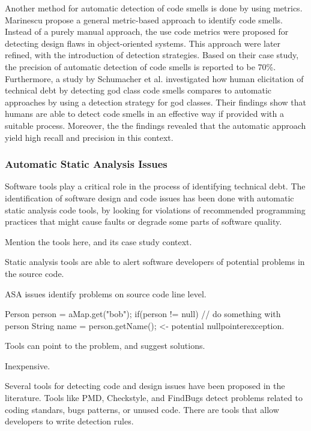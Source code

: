 Another method for automatic detection of code smells is done by using metrics. Marinescu\cite{marinescu2001detecting} propose a general metric-based approach to identify code smells. Instead of a purely manual approach, the use code metrics were proposed for detecting design flaws in object-oriented systems. This approach were later refined, with the introduction of detection strategies\cite{marinescu2004detection}. Based on their case study, the precision of automatic detection of code smells is reported to be 70\%. Furthermore, a study by Schumacher et al.\cite{schumacher2010building} investigated how human elicitation of technical debt by detecting god class code smells compares to automatic approaches by using a detection strategy for god classes. Their findings show that humans are able to detect code smells in an effective way if provided with a suitable process. Moreover, the the findings revealed that the automatic approach yield high recall and precision in this context. 



\subsubsection{Automatic Static Analysis Issues}
Software tools play a critical role in the process of identifying technical debt. The identification of software design and code issues has been done with automatic static analysis code tools, by looking for violations of recommended programming practices that might cause faults or degrade some parts of software quality. 

Mention the tools here, and its case study context.


Static analysis tools are able to alert software developers of potential problems in the source code. 
 
 ASA issues identify problems on source code line level.

 Person person = aMap.get("bob");
 if(person != null) {
 	// do something with person
 }
 String name = person.getName(); <- potential nullpointerexception. 

 Tools can point to the problem, and suggest solutions. 

 Inexpensive.

 Several tools for detecting code and design issues have been proposed in the literature. Tools like PMD, Checkstyle, and FindBugs detect problems related to coding standars, bugs patterns, or unused code. There are tools that allow developers to write detection rules.

